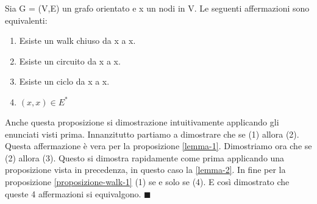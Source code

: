 \newpage
\begin{proposition}\label{proposizione-walk-2}
    Sia G = (V,E) un grafo orientato e x un nodi in V. Le seguenti affermazioni sono equivalenti:
    \begin{enumerate}
        \item Esiste un walk chiuso da x a x.
        \item Esiste un circuito da x a x.
        \item Esiste un ciclo da x a x.
        \item $(x,x) \in E^*$
    \end{enumerate}
\end{proposition}
\begin{demostration}
Anche questa proposizione si dimostrazione intuitivamente applicando gli enunciati visti prima. Innanzitutto partiamo a dimostrare che se (1) allora (2). Questa affermazione è vera per la proposizione \ref{lemma-1}. Dimostriamo ora che se (2) allora (3). Questo si dimostra rapidamente come prima applicando una proposizione vista in precedenza, in questo caso la \ref{lemma-2}. In fine per la proposizione \ref{proposizione-walk-1} (1) se e solo se (4). E così dimostrato che queste 4 affermazioni si equivalgono. $\blacksquare$
\end{demostration}


